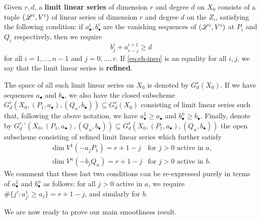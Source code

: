 \documentclass{amsart}
\begin{document}
\begin{defn}\label{defn:lls} Given $r,d$, a \textbf{limit linear series}
of dimension $r$ and degree $d$ on $X_0$ consists of a tuple $({\mathscr L}^i,V^i)$ of 
linear series of dimension $r$ and degree $d$ on the $Z_i$, satisfying the
following condition: if $a^i_{\bullet},b^i_{\bullet}$ are the vanishing
sequences of $({\mathscr L}^i,V^i)$ at $P_i$ and $Q_i$ respectively, then we require
\begin{equation}\label{eq:eh-ineq} 
b^i_j+a^{i+1}_{r-j} \geq d
\end{equation}
for all $i=1,\dots,n-1$ and $j=0,\dots,r$. If \eqref{eq:eh-ineq} is an
equality for all $i,j$, we say that the limit linear series is
\textbf{refined}.

The space of all such limit linear series on $X_0$ is denoted by
$G^r_d(X_0)$. If we have sequences $a_{\bullet}$ and $b_{\bullet}$,
we also have the closed subscheme 
$G^r_d(X_0,(P_1,a_{\bullet}),(Q_n,b_{\bullet})) \subseteq G^r_d(X_0)$
consisting of limit linear series such that, following the above notation,
we have $a^1_{\bullet} \geq a_{\bullet}$ and $b^n_{\bullet} \geq b_{\bullet}$.
Finally, denote by
$G^{r,\circ}_d(X_0,(P_1,a_{\bullet}),(Q_n,b_{\bullet})) \subseteq 
G^r_d(X_0,(P_1,a_{\bullet}),(Q_n,b_{\bullet}))$ the open subscheme
consisting of refined limit linear series which further satisfy
\begin{eqnarray*}
\dim V^1(-a_j P_1) =r+1-j &\text{for $j>0$ active in $a$,}\\
\dim V^n(-b_j Q_n) =r+1-j &\text{for $j>0$ active in $b$.}
\end{eqnarray*}
We comment that these last two conditions can be re-expressed purely in terms of $a^1_\bullet$ and $b^n_\bullet$ as follows: for all $j>0$ active in $a$, we require
$\#\{j':a^1_{j'} \ge a_j\} = r+1-j$, and similarly for $b$.
\end{defn}




We are now ready to prove our main smoothness result. %
\end{document}
